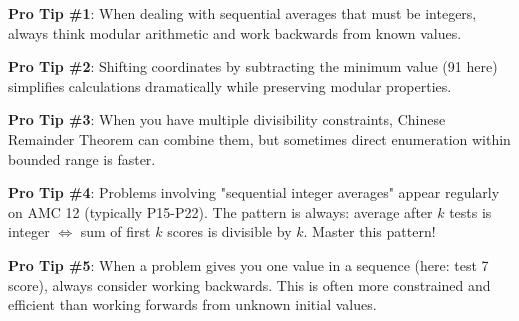 \documentclass[11pt]{article}
\begin{document}
\begin{tipbox}
\textbf{Pro Tip \#1}: When dealing with sequential averages that must be integers, always think modular arithmetic and work backwards from known values.

\textbf{Pro Tip \#2}: Shifting coordinates by subtracting the minimum value (91 here) simplifies calculations dramatically while preserving modular properties.

\textbf{Pro Tip \#3}: When you have multiple divisibility constraints, Chinese Remainder Theorem can combine them, but sometimes direct enumeration within bounded range is faster.

\textbf{Pro Tip \#4}: Problems involving "sequential integer averages" appear regularly on AMC 12 (typically P15-P22). The pattern is always: average after $k$ tests is integer $\Leftrightarrow$ sum of first $k$ scores is divisible by $k$. Master this pattern!

\textbf{Pro Tip \#5}: When a problem gives you one value in a sequence (here: test 7 score), always consider working backwards. This is often more constrained and efficient than working forwards from unknown initial values.
\end{tipbox}
\end{document}
